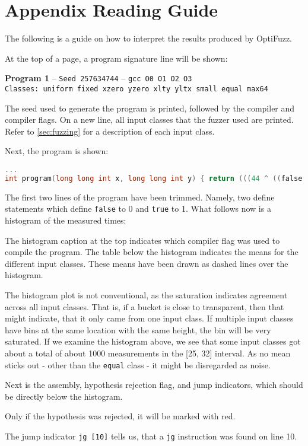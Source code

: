 \section*{Appendix Reading Guide}
The following is a guide on how to interpret the results produced by OptiFuzz. 

At the top of a page, a program signature line will be shown:
\begin{center}
    \textbf{Program 1} -- \texttt{Seed 257634744} -- \texttt{gcc O0 O1 O2 O3}\\\small\texttt{Classes: uniform fixed xzero yzero xlty yltx small equal max64}\\[2mm]
\end{center}
The seed used to generate the program is printed, followed by the compiler and compiler flags.
On a new line, all input classes that the fuzzer used are printed.
Refer to \ref{sec:fuzzing} for a description of each input class.

Next, the program is shown:
\begin{lstlisting}[style=defstyle,language=C]
...
int program(long long int x, long long int y) { return (((44 ^ ((false >> (-874552120269441001 == x)) | ((53 * 29) >= (-5509653365268467218 ^ x)))) * 24) & (false + x)); }
\end{lstlisting}
The first two lines of the program have been trimmed. Namely, two define statements
which define \texttt{false} to 0 and \texttt{true} to 1.
What follows now is a histogram of the measured times:

The histogram caption at the top indicates which compiler flag was used to compile the program.
The table below the histogram indicates the means for the different input classes.
These means have been drawn as dashed lines over the histogram.

The histogram plot is not conventional, as the saturation indicates agreement across all input classes.
That is, if a bucket is close to transparent, then that might indicate, that it only came from one input class.
If multiple input classes have bins at the same location with the same height, the bin will be very saturated. 
If we examine the histogram above, we see that some input classes got about a total of about 1000 measurements in the [25, 32] interval.
As no mean sticks out - other than the \texttt{equal} class - it might be disregarded as noise.

Next is the assembly, hypothesis rejection flag, and jump indicators, which should be directly below the histogram.

Only if the hypothesis was rejected, it will be marked with red.

The jump indicator \texttt{jg [10]} tells us, that a \texttt{jg} instruction was found on line 10.

\newpage